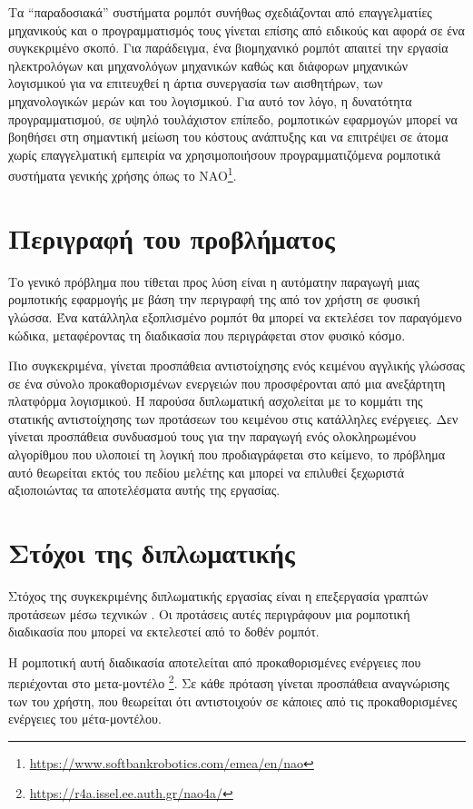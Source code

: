 Τα \enquote{παραδοσιακά} συστήματα ρομπότ συνήθως σχεδιάζονται από επαγγελματίες μηχανικούς και ο προγραμματισμός τους γίνεται επίσης από ειδικούς και αφορά σε ένα συγκεκριμένο σκοπό.
Για παράδειγμα, ένα βιομηχανικό ρομπότ απαιτεί την εργασία ηλεκτρολόγων και μηχανολόγων μηχανικών καθώς και διάφορων μηχανικών λογισμικού για να επιτευχθεί η άρτια συνεργασία των αισθητήρων, των μηχανολογικών μερών και του λογισμικού.
Για αυτό τον λόγο, η δυνατότητα προγραμματισμού, σε υψηλό τουλάχιστον επίπεδο, ρομποτικών εφαρμογών μπορεί να βοηθήσει στη σημαντική μείωση του κόστους ανάπτυξης και να επιτρέψει σε άτομα χωρίς επαγγελματική εμπειρία να χρησιμοποιήσουν προγραμματιζόμενα ρομποτικά συστήματα γενικής χρήσης όπως το NAO\footnote{\url{https://www.softbankrobotics.com/emea/en/nao}}.

\section{Περιγραφή του προβλήματος}\label{sec:problem-description}
Το γενικό πρόβλημα που τίθεται προς λύση είναι η αυτόματην παραγωγή μιας ρομποτικής εφαρμογής με βάση την περιγραφή της από τον χρήστη σε φυσική γλώσσα.
Ένα κατάλληλα εξοπλισμένο ρομπότ θα μπορεί να εκτελέσει τον παραγόμενο κώδικα, μεταφέροντας τη διαδικασία που περιγράφεται στον φυσικό κόσμο.

Πιο συγκεκριμένα, γίνεται προσπάθεια αντιστοίχησης ενός κειμένου αγγλικής γλώσσας σε ένα σύνολο προκαθορισμένων ενεργειών που προσφέρονται από μια ανεξάρτητη πλατφόρμα λογισμικού.
Η παρούσα διπλωματική ασχολείται με το κομμάτι της στατικής αντιστοίχησης των προτάσεων του κειμένου στις κατάλληλες ενέργειες.
Δεν γίνεται προσπάθεια συνδυασμού τους για την παραγωγή ενός ολοκληρωμένου αλγορίθμου που υλοποιεί τη λογική που προδιαγράφεται στο κείμενο,
το πρόβλημα αυτό θεωρείται εκτός του πεδίου μελέτης και μπορεί να επιλυθεί ξεχωριστά αξιοποιώντας τα αποτελέσματα αυτής της εργασίας.

\section{Στόχοι της διπλωματικής}\label{sec:diploma-purpose}
Στόχος της συγκεκριμένης διπλωματικής εργασίας είναι η επεξεργασία γραπτών προτάσεων μέσω τεχνικών
.
Οι προτάσεις αυτές περιγράφουν μια ρομποτική διαδικασία που μπορεί να εκτελεστεί από το δοθέν ρομπότ.

Η ρομποτική αυτή διαδικασία αποτελείται από προκαθορισμένες ενέργειες που περιέχονται στο μετα-μοντέλο \metamodel{}\footnote{\url{https://r4a.issel.ee.auth.gr/nao4a/}}.
Σε κάθε πρόταση γίνεται προσπάθεια αναγνώρισης των  του χρήστη,
που θεωρείται ότι αντιστοιχούν σε κάποιες από τις προκαθορισμένες ενέργειες του μέτα-μοντέλου.

